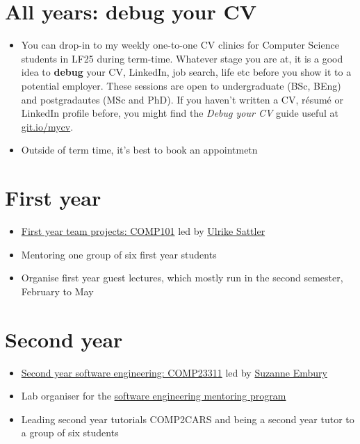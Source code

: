 \documentclass[12pt,]{book}
\providecommand{\tightlist}{%
  \setlength{\itemsep}{0pt}\setlength{\parskip}{0pt}}
\begin{document}
\hypertarget{all-years-debug-your-cv}{%
\section{All years: debug your CV}\label{all-years-debug-your-cv}}

\begin{itemize}
\tightlist
\item
  You can drop-in to my weekly one-to-one CV clinics for Computer Science students in LF25 during term-time. Whatever stage you are at, it is a good idea to \textbf{debug} your CV, LinkedIn, job search, life etc before you show it to a potential employer. These sessions are open to undergraduate (BSc, BEng) and postgradautes (MSc and PhD). If you haven't written a CV, résumé or LinkedIn profile before, you might find the \emph{Debug your CV} guide useful at \href{http://git.io/mycv}{git.io/mycv}.
\item
  Outside of term time, it's best to book an appointmetn
\end{itemize}

\hypertarget{first-year}{%
\section{First year}\label{first-year}}

\begin{itemize}
\tightlist
\item
  \href{https://studentnet.cs.manchester.ac.uk/ugt/COMP10120/syllabus/}{First year team projects: COMP101} led by \href{http://www.cs.man.ac.uk/~sattler/}{Ulrike Sattler}
\item
  Mentoring one group of six first year students
\item
  Organise first year guest lectures, which mostly run in the second semester, February to May
\end{itemize}

\hypertarget{second-year}{%
\section{Second year}\label{second-year}}

\begin{itemize}
\tightlist
\item
  \href{https://studentnet.cs.manchester.ac.uk/ugt/COMP23311/syllabus/}{Second year software engineering: COMP23311} led by \href{http://www.cs.man.ac.uk/~embury/}{Suzanne Embury}
\item
  Lab organiser for the \href{https://www.cs.manchester.ac.uk/connect/business-engagement/industrial-mentoring/}{software engineering mentoring program}
\item
  Leading second year tutorials COMP2CARS and being a second year tutor to a group of six students
\end{itemize}
\end{document}
